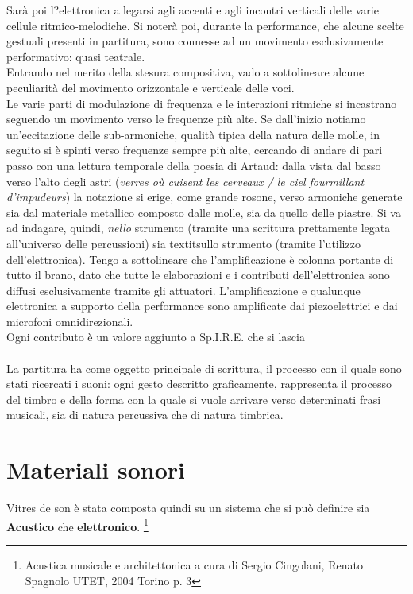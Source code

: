 Sarà poi l?elettronica a legarsi agli accenti e agli incontri verticali delle varie cellule ritmico-melodiche. Si noterà poi, durante la performance, che alcune scelte gestuali presenti in partitura, sono connesse ad un movimento esclusivamente performativo: quasi teatrale.\\
Entrando nel merito della stesura compositiva, vado a sottolineare alcune peculiarità del movimento orizzontale e verticale delle voci. \\
Le varie parti di modulazione di frequenza e le interazioni ritmiche si incastrano seguendo un movimento verso le frequenze più alte. Se dall'inizio notiamo un'eccitazione delle sub-armoniche, qualità tipica della natura delle molle, in seguito si è spinti verso frequenze sempre più alte, cercando di andare di pari passo con una lettura temporale della poesia di Artaud: dalla vista dal basso verso l'alto degli astri (\textit{verres où cuisent les cerveaux / le ciel fourmillant d'impudeurs}) la notazione si erige, come grande rosone, verso armoniche generate sia dal materiale metallico composto dalle molle, sia da quello delle piastre. Si va ad indagare, quindi, \textit{nello} strumento (tramite una scrittura prettamente legata all'universo delle percussioni) sia textit{sullo} strumento (tramite l'utilizzo dell'elettronica). Tengo a sottolineare che l'amplificazione è colonna portante di tutto il brano, dato che tutte le elaborazioni e i contributi dell'elettronica sono diffusi esclusivamente tramite gli attuatori. L'amplificazione e qualunque elettronica a supporto della performance sono amplificate dai piezoelettrici e dai microfoni omnidirezionali. \\
Ogni contributo è un valore aggiunto a Sp.I.R.E. che si lascia 
\\
\\
La partitura ha come oggetto principale di scrittura, il processo con il quale sono stati ricercati i suoni: ogni gesto descritto graficamente, rappresenta il processo del timbro e della forma con la quale si vuole arrivare verso determinati frasi musicali, sia di natura percussiva che di natura timbrica.

\section{Materiali sonori}
Vitres de son è stata composta quindi su un sistema che si può definire sia \textbf{Acustico} che \textbf{elettronico}. \footnote{Acustica musicale e architettonica a cura di Sergio Cingolani, Renato Spagnolo UTET, 2004 Torino p. 3}

